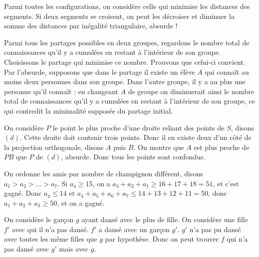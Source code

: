 \begin{sol}
Parmi toutes les configurations, on considère celle qui minimise les distances des segments. Si deux segments se croisent, on peut les décroiser et diminuer la somme des distances par inégalité triangulaire, absurde !
\end{sol}

\begin{sol}
Parmi tous les partages possibles en deux groupes, regardons le nombre total de connaissances qu’il y a cumulées en restant à l’intérieur de son groupe. Choisissons le partage qui minimise ce nombre. Prouvons que celui-ci convient. 
\newline
Par l’absurde, supposons que dans le partage il existe un élève $A$ qui connaît au moins deux personnes dans son groupe. Dans l’autre groupe, il y a au plus une personne qu’il connaît : en changeant $A$ de groupe on diminuerait ainsi le nombre total de connaissances qu’il y a cumulées en restant à l’intérieur de son groupe, ce qui contredit la minimalité supposée du partage initial.
\end{sol}

\begin{sol}
 On considère $P$ le point le plus proche d'une droite reliant des points de $S$, disons $(d)$. Cette droite doit contenir trois points. Donc il en existe deux d'un côté de la projection orthogonale, disons $A$ puis $B$. On montre que $A$ est plus proche de $PB$ que $P$ de $(d)$, absurde. Donc tous les points sont confondus. 
\end{sol}

\begin{sol}
On ordonne les amis par nombre de champignon différent, disons $a_1>a_2>\dots>a_7$. Si $a_4\ge 15$, on a $a_3+a_2+a_1\ge 16+17+18=51$, et c'est gagné. Donc $a_4\le 14$ et $a_4+a_5+a_6+a_7\le 14+13+12+11=50$, donc $a_1+a_2+a_3\ge 50$, et on a gagné. 
\end{sol}

\begin{sol}
On considère le garçon $g$ ayant dansé avec le plus de fille. On considère une fille $f'$ avec qui il n'a pas dansé. $f'$ a dansé avec un garçon $g'$. $g'$ n'a pas pu dansé avec toutes les même filles que $g$ par hypothèse. Donc on peut trouver $f$ qui n'a pas dansé avec $g'$ mais avec $g$. 
\end{sol}